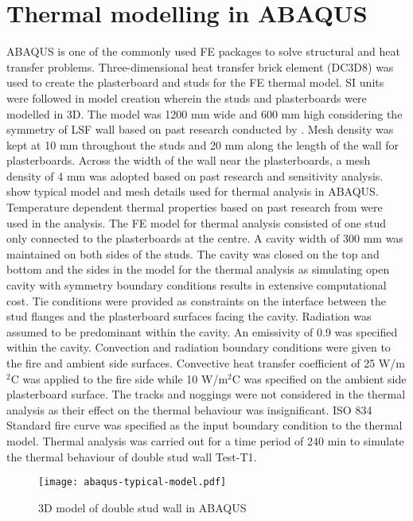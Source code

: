 \section{Thermal modelling in ABAQUS}

ABAQUS is one of the commonly used FE packages to solve structural and heat transfer problems. Three-dimensional heat transfer brick element (DC3D8) was used to create the plasterboard and studs for the FE thermal model. SI units were followed in model creation wherein the studs and plasterboards were modelled in 3D. The model was 1200 mm wide and 600 mm high considering the symmetry of LSF wall based on past research conducted by \citet{Rusthi2017,Ariyanayagam2019}. Mesh density was kept at 10 mm throughout the studs and 20 mm along the length of the wall for plasterboards. Across the width of the wall near the plasterboards, a mesh density of 4 mm was adopted based on past research and sensitivity analysis.  show typical model and mesh details used for thermal analysis in ABAQUS. Temperature dependent thermal properties based on past research from \citet{Maneesha2018} were used in the analysis. The FE model for thermal analysis consisted of one stud only connected to the plasterboards at the centre. A cavity width of 300 mm was maintained on both sides of the studs. The cavity was closed on the top and bottom and the sides in the model for the thermal analysis as simulating open cavity with symmetry boundary conditions results in extensive computational cost. Tie conditions were provided as constraints on the interface between the stud flanges and the plasterboard surfaces facing the cavity. Radiation was assumed to be predominant within the cavity. An emissivity of 0.9 was specified within the cavity. Convection and radiation boundary conditions were given to the fire and ambient side surfaces. Convective heat transfer coefficient of 25 W/m$^2$\degree C was applied to the fire side while 10 W/m$^2$\degree C was specified on the ambient side plasterboard surface. The tracks and noggings were not considered in the thermal analysis as their effect on the thermal behaviour was insignificant. ISO 834 Standard fire curve was specified as the input boundary condition to the thermal model. Thermal analysis was carried out for a time period of 240 min to simulate the thermal behaviour of double stud wall Test-T1.
\begin{figure}[!htbp]
	\centering
		\texttt{[image: abaqus-typical-model.pdf]}
		\caption{3D model of double stud wall in ABAQUS}
		\label{fig:abaqus-typical-model-thermal}
\end{figure}

